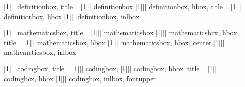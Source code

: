 [1][]{
    definitionbox,
    title=
}
[1][]{
    definitionbox
}
[1][]{
    definitionbox,
    hbox,
    title=
    }
[1][]{
    definitionbox,
    hbox
}
\newtcbox{\inldefbox}[1][]{
    definitionbox,
    inlbox
}

[1][]{
    mathematicsbox,
    title=
}
[1][]{
    mathematicsbox
}
[1][]{
    mathematicsbox,
    hbox,
    title=
    }
[1][]{
    mathematicsbox,
    hbox
}
[1][]{
    mathematicsbox,
    hbox,
    center   
}
\newtcbox{\inlmathbox}[1][]{
    mathematicsbox,
    inlbox
}

[1][]{
    codingbox,
    title=
}
[1][]{
    codingbox,
}
[1][]{
    codingbox,
    hbox,
    title=
    }
[1][]{
    codingbox,
    hbox
}
\newtcbox{\inlcodebox}[1][]{
    codingbox,
    inlbox,
    fontupper=\ttfamily
}

\newcommand\defc[1]{{\textbf{\color{\MainColor}#1}}}
\newcommand\defco[1]{{\color{\MainColor}#1}}

\usepackage{parskip} %
\usepackage[toc,sort=use]{glossaries}